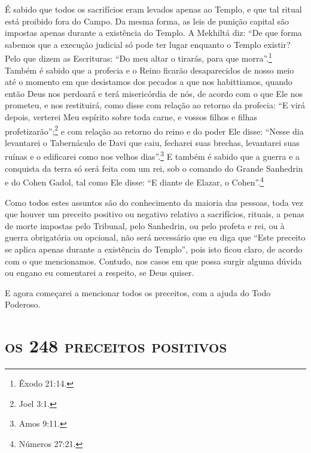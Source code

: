 É sabido que todos os sacrifícios eram levados apenas ao Templo, e que
tal ritual está proibido fora do Campo. Da mesma forma, as leis de
punição capital são impostas apenas durante a existência do Templo. A
Mekhiltá diz: ``De que forma sabemos que a execução judicial só pode ter
lugar enquanto o Templo existir? Pelo que dizem as Escrituras: ``Do meu
altar o tirarás, para que morra''.\footnote{Êxodo 21:14.} Também é sabido que a
profecia e o Reino ficarão desaparecidos de nosso meio até o momento em
que desistamos dos pecados a que nos habittiamos, quando então Deus nos
perdoará e terá misericórdia de nós, de acordo com o que Ele nos
prometeu, e nos restituirá, como disse com relação ao retorno da
profecia: ``E virá depois, verterei Meu espírito sobre toda carne, e
vossos filhos e filhas profetizarão'';\footnote{Joel 3:1.} e com relação ao
retorno do reino e do poder Ele disse: ``Nesse dia levantarei o
Tabernáculo de Davi que caiu, fecharei suas brechas, levantarei suas
ruínas e o edificarei como nos velhos dias''.\footnote{Amos 9:11.} E também é
sabido que a guerra e a conquista da terra só será feita com um rei, sob
o comando do Grande Sanhedrin e do Cohen Gadol, tal como Ele disse:
``E diante de Elazar, o Cohen''.\footnote{Números 27:21.}


Como todos estes assuntos são do conhecimento da maioria das pessoas,
toda vez que houver um preceito positivo ou negativo relativo a
sacrifícios, rituais, a penas de morte impostas pelo Tribunal, pelo
Sanhedrin, ou pelo profeta e rei, ou à guerra obrigatória ou opcional,
não será necessário que eu diga que ``Este preceito se aplica apenas
durante a existência do Templo'', pois isto ficou claro, de acordo com o
que mencionamos. Contudo, nos casos em que possa surgir alguma dúvida ou
engano eu comentarei a respeito, se Deus quiser.

E agora começarei a mencionar todos os preceitos, com a ajuda do Todo
Poderoso.

\begingroup\makeatletter\@openrightfalse
\part{\textsc{os 248 preceitos positivos}}

